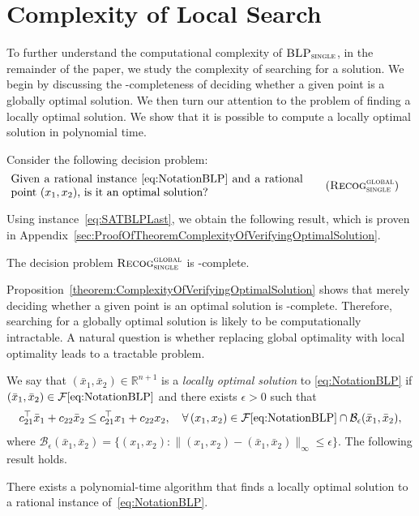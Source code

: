 \documentclass[runningheads,orivec]{llncs}
\newif\ifIPCOFlag
\newcommand{\IPCO}[2]{\ifIPCOFlag#1\else#2\fi}
\newcommand{\MacroColor}[1]{#1}
\newcommand{\ComplexityClassStyle}[1]{#1}
\newcommand{\ClassCoNP}{\MacroColor{\text{\ComplexityClassStyle{coNP}}}}
\newcommand{\BLPWithSingleUpperLevelVariable}{\MacroColor{$\textsc{BLP}_{\textsc{single}}$}}
\newcommand{\GlobalOptimalProblemName}{\MacroColor{$\textsc{Recog}_{\textsc{single}}^{\textsc{global}}$}}
\newcommand{\GlobalOptimalProblem}{\hyperref[GlobalOptimalProblemAnchor]{\GlobalOptimalProblemName{}}}
\newcommand{\NVariables}{\MacroColor{n}}
\newcommand{\FeasSolSet}{\MacroColor{\mathcal{F}}}
\begin{document}
\section{Complexity of Local Search}
\label{sec:ComplexityOfVerifyingASolution}

To further understand the computational complexity of \BLPWithSingleUpperLevelVariable{}, in the remainder of the paper, we study the complexity of searching for a solution.
We begin by discussing the \ClassCoNP{}-completeness of deciding whether a given point is a globally optimal solution.
We then turn our attention to the problem of finding a locally optimal solution.
We show that it is possible to compute a locally optimal solution in polynomial time.

Consider the following decision problem:
\begin{align*}
&
\parbox{0.75\textwidth}{Given a rational instance \eqref{eq:NotationBLP} and a rational point $(x_1, x_2)$, is it an optimal solution?}
\label{GlobalOptimalProblemAnchor}
\tag{\GlobalOptimalProblemName{}}
\end{align*}

Using instance~\eqref{eq:SATBLPLast}, we obtain the following result, which is proven in \IPCO{the full version of the paper~\cite{sugishita2025complexitybilevellinearprogramming}}{Appendix~\ref{sec:ProofOfTheoremComplexityOfVerifyingOptimalSolution}}.
\begin{proposition}
\label{theorem:ComplexityOfVerifyingOptimalSolution}
The decision problem \GlobalOptimalProblem{} is \ClassCoNP{}-complete.
\end{proposition}

Proposition~\ref{theorem:ComplexityOfVerifyingOptimalSolution} shows that merely deciding whether a given point is an optimal solution is \ClassCoNP{}-complete.
Therefore, searching for a globally optimal solution is likely to be computationally intractable.
A natural question is whether replacing global optimality with local optimality leads to a tractable problem.

We say that $(\bar{x}_1, \bar{x}_2) \in \mathbb{R}^{\NVariables + 1}$ is a \emph{locally optimal solution} to \eqref{eq:NotationBLP} if $(\bar{x}_1, \bar{x}_2) \in \FeasSolSet\eqref{eq:NotationBLP}$ and there exists $\epsilon > 0$ such that
$$
c_{2 1}^{\top} \bar{x}_1 + c_{2 2} \bar{x}_2 \le c_{2 1}^{\top} x_1 + c_{2 2} x_2,
\quad \forall\, (x_1, x_2) \in \FeasSolSet\eqref{eq:NotationBLP} \cap \mathcal{B}_{\epsilon}(\bar{x}_1, \bar{x}_2),
$$
where
$
\mathcal{B}_{\epsilon}(\bar{x}_1, \bar{x}_2) = \{ (x_1, x_2) : \| (x_1, x_2) - (\bar{x}_1, \bar{x}_2) \|_{\infty} \le \epsilon \}.
$
The following result holds.
\begin{theorem}
\label{theorem:ComplexityOfLocalSearch}
There exists a polynomial-time algorithm that finds a locally optimal solution to a rational instance of~\eqref{eq:NotationBLP}.
\end{theorem}
\end{document}
